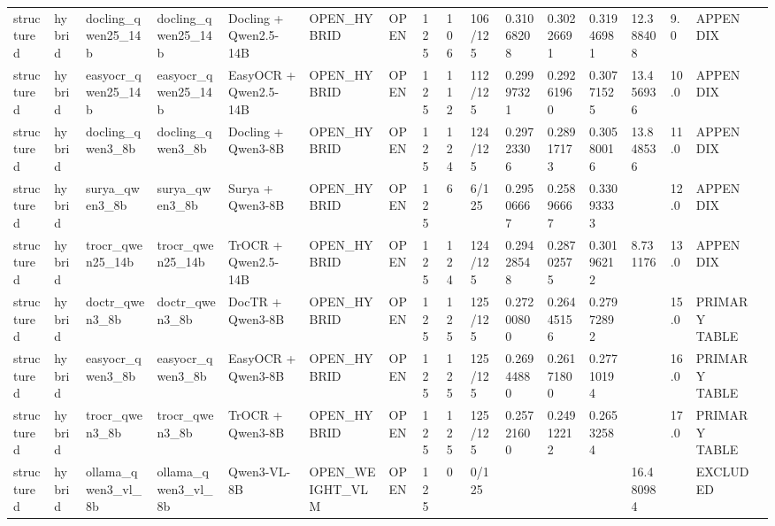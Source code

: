 \begin{table}
\begin{tabular}{lllllllllllllllll}
structured & hybrid & docling\_qwen25\_14b & docling\_qwen25\_14b & Docling + Qwen2.5-14B & OPEN\_HYBRID & OPEN & 125 & 106 & 106/125 & 0.31068208 & 0.30226691 & 0.31946981 & 12.388408 & 9.0 & APPENDIX &  \\
structured & hybrid & easyocr\_qwen25\_14b & easyocr\_qwen25\_14b & EasyOCR + Qwen2.5-14B & OPEN\_HYBRID & OPEN & 125 & 112 & 112/125 & 0.29997321 & 0.29261960 & 0.30771525 & 13.456936 & 10.0 & APPENDIX &  \\
structured & hybrid & docling\_qwen3\_8b & docling\_qwen3\_8b & Docling + Qwen3-8B & OPEN\_HYBRID & OPEN & 125 & 124 & 124/125 & 0.29723306 & 0.28917173 & 0.30580016 & 13.848536 & 11.0 & APPENDIX &  \\
structured & hybrid & surya\_qwen3\_8b & surya\_qwen3\_8b & Surya + Qwen3-8B & OPEN\_HYBRID & OPEN & 125 & 6 & 6/125 & 0.29506667 & 0.25896667 & 0.33093333 &  & 12.0 & APPENDIX &  \\
structured & hybrid & trocr\_qwen25\_14b & trocr\_qwen25\_14b & TrOCR + Qwen2.5-14B & OPEN\_HYBRID & OPEN & 125 & 124 & 124/125 & 0.29428548 & 0.28702575 & 0.30196212 & 8.731176 & 13.0 & APPENDIX &  \\
structured & hybrid & doctr\_qwen3\_8b & doctr\_qwen3\_8b & DocTR + Qwen3-8B & OPEN\_HYBRID & OPEN & 125 & 125 & 125/125 & 0.27200800 & 0.26445156 & 0.27972892 &  & 15.0 & PRIMARY TABLE &  \\
structured & hybrid & easyocr\_qwen3\_8b & easyocr\_qwen3\_8b & EasyOCR + Qwen3-8B & OPEN\_HYBRID & OPEN & 125 & 125 & 125/125 & 0.26944880 & 0.26171800 & 0.27710194 &  & 16.0 & PRIMARY TABLE &  \\
structured & hybrid & trocr\_qwen3\_8b & trocr\_qwen3\_8b & TrOCR + Qwen3-8B & OPEN\_HYBRID & OPEN & 125 & 125 & 125/125 & 0.25721600 & 0.24912212 & 0.26532584 &  & 17.0 & PRIMARY TABLE &  \\
structured & hybrid & ollama\_qwen3\_vl\_8b & ollama\_qwen3\_vl\_8b & Qwen3-VL-8B & OPEN\_WEIGHT\_VLM & OPEN & 125 & 0 & 0/125 &  &  &  & 16.480984 &  & EXCLUDED &  \\
\bottomrule
\end{tabular}
\end{table}
